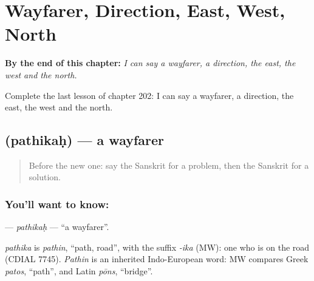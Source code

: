 
\chapter{Wayfarer, Direction, East, West, North}
\label{ch:sa-wayfarer-direction-east-west-north}

\begin{chapteropening}
\textbf{By the end of this chapter:} \emph{I can say a wayfarer, a direction, the east, the west and the north.}

Complete the last lesson of chapter 202: I can say a wayfarer, a direction, the east, the west and the north.
\end{chapteropening}

\section[\texorpdfstring{\sk{पथिकः} (pathikaḥ)}{पथिकः (pathikaḥ)}]{ (pathikaḥ) — a wayfarer}

\label{lesson:SA-C202-pathikah}



\begin{quote}
Before the new one: say the Sanskrit for a problem, then the Sanskrit for a solution.
\end{quote}

\subsection*{You'll want to know: }
\textbf{} — \emph{pathikaḥ} — \textquotedblleft{}a wayfarer\textquotedblright{}.

\begin{cousinweb}
\emph{pathika} is \emph{pathin}, \textquotedblleft{}path, road\textquotedblright{}, with the suffix \emph{-ika} (MW): one who is on the road (CDIAL 7745). \emph{Pathin} is an inherited Indo-European word: MW compares Greek \emph{patos}, \textquotedblleft{}path\textquotedblright{}, and Latin \emph{pōns}, \textquotedblleft{}bridge\textquotedblright{}.
\end{cousinweb}

